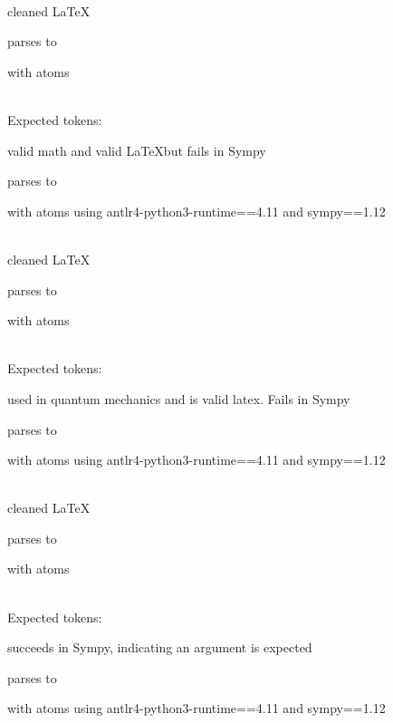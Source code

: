 \documentclass{article}
\begin{document}
\ \\
cleaned \LaTeX

parses to

with atoms


\ \\
Expected tokens:


\hrulefill

valid math and valid \LaTeX but fails in Sympy

parses to

with atoms
using antlr4-python3-runtime==4.11 and sympy==1.12

\ \\
cleaned \LaTeX

parses to

with atoms


\ \\
Expected tokens:


\hrulefill

used in quantum mechanics and is valid latex. Fails in Sympy

parses to

with atoms
using antlr4-python3-runtime==4.11 and sympy==1.12

\ \\
cleaned \LaTeX

parses to

with atoms


\ \\
Expected tokens:


\hrulefill

succeeds in Sympy, indicating an argument is expected

parses to

with atoms
using antlr4-python3-runtime==4.11 and sympy==1.12
\end{document}
